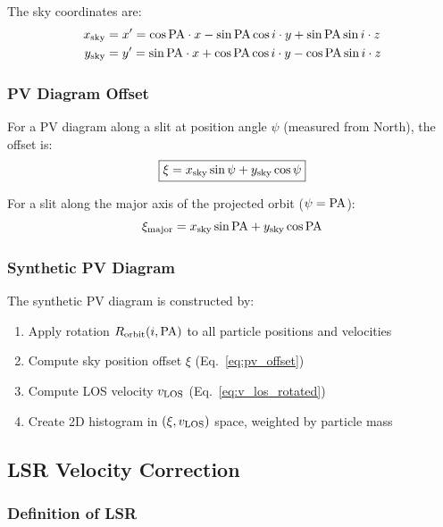 \documentclass[twocolumn,amsmath,amssymb,prd,superscriptaddress,nofootinbib]{revtex4-2}
\begin{document}
The sky coordinates are:
\begin{align}
    x_{\rm sky} &= x' = \cos{\rm PA} \cdot x - \sin{\rm PA}\cos i \cdot y + \sin{\rm PA}\sin i \cdot z \\
    y_{\rm sky} &= y' = \sin{\rm PA} \cdot x + \cos{\rm PA}\cos i \cdot y - \cos{\rm PA}\sin i \cdot z
\end{align}

\subsubsection{PV Diagram Offset}

For a PV diagram along a slit at position angle $\psi$ (measured from North), the offset is:
\begin{equation}
    \boxed{\xi = x_{\rm sky}\sin\psi + y_{\rm sky}\cos\psi}
    \label{eq:pv_offset}
\end{equation}

For a slit along the major axis of the projected orbit ($\psi = {\rm PA}$):
\begin{equation}
    \xi_{\rm major} = x_{\rm sky}\sin{\rm PA} + y_{\rm sky}\cos{\rm PA}
\end{equation}

\subsubsection{Synthetic PV Diagram}

The synthetic PV diagram is constructed by:
\begin{enumerate}
    \item Apply rotation $R_{\rm orbit}(i, {\rm PA})$ to all particle positions and velocities
    \item Compute sky position offset $\xi$ (Eq.~\ref{eq:pv_offset})
    \item Compute LOS velocity $v_{\rm LOS}$ (Eq.~\ref{eq:v_los_rotated})
    \item Create 2D histogram in $(\xi, v_{\rm LOS})$ space, weighted by particle mass
\end{enumerate}

\subsection{LSR Velocity Correction}
\label{sec:lsr_correction}

\subsubsection{Definition of LSR}
\end{document}
